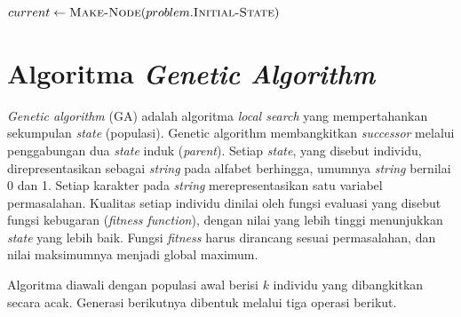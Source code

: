 \begin{algorithm}[H]
\caption{Simulated Annealing}
\label{alg:simulated-annealing}
$current \gets \textsc{Make-Node}(problem.\textsc{Initial-State})$\;
\end{algorithm}

\section{Algoritma \textit{Genetic Algorithm}}

\textit{Genetic algorithm} (GA) adalah algoritma \textit{local search} yang mempertahankan sekumpulan \textit{state} (populasi). Genetic algorithm membangkitkan \textit{successor} melalui penggabungan dua \textit{state} induk (\textit{parent}). Setiap \textit{state}, yang disebut individu, direpresentasikan sebagai \textit{string} pada alfabet berhingga, umumnya \textit{string} bernilai 0 dan 1. Setiap karakter pada \textit{string} merepresentasikan satu variabel permasalahan. Kualitas setiap individu dinilai oleh fungsi evaluasi yang disebut fungsi kebugaran (\textit{fitness function}), dengan nilai yang lebih tinggi menunjukkan \textit{state} yang lebih baik. Fungsi \textit{fitness} harus dirancang sesuai permasalahan, dan nilai maksimumnya menjadi global maximum.

Algoritma diawali dengan populasi awal berisi $k$ individu yang dibangkitkan secara acak. Generasi berikutnya dibentuk melalui tiga operasi berikut.

